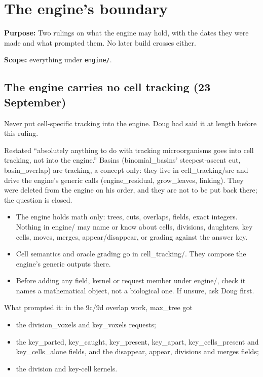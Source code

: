 \chapter{\texorpdfstring{The engine's boundary}{The engine's boundary}}
\label{chap:engine-boundary}

\textbf{Purpose:} Two rulings on what the engine may hold, with the dates they were made and what prompted them. No later build crosses either.

\textbf{Scope:} everything under \texttt{engine/\allowbreak{}}.

\section{\texorpdfstring{The engine carries no cell tracking (23 September)}{The engine carries no cell tracking (23 September)}}

Never put cell-specific tracking into the engine. Doug had said it at length before this ruling.

Restated “absolutely anything to do with tracking microorganisms goes into cell tracking, not into the engine.” Basins (binomial\_\allowbreak{}basins' steepest-ascent cut, basin\_\allowbreak{}overlap) are tracking, a concept only: they live in cell\_\allowbreak{}tracking/src and drive the engine's generic calls (engine\_\allowbreak{}residual, grow\_\allowbreak{}leaves, linking). They were deleted from the engine on his order, and they are not to be put back there; the question is closed.

\begin{itemize}
\item The engine holds math only: trees, cuts, overlaps, fields, exact integers. Nothing in engine/ may name or know about cells, divisions, daughters, key cells, moves, merges, appear/disappear, or grading against the answer key.
\item Cell semantics and oracle grading go in cell\_\allowbreak{}tracking/. They compose the engine's generic outputs there.
\item Before adding any field, kernel or request member under engine/, check it names a mathematical object, not a biological one. If unsure, ask Doug first.
\end{itemize}

What prompted it: in the 9c/9d overlap work, max\_\allowbreak{}tree got

\begin{itemize}
\item the division\_\allowbreak{}voxels and key\_\allowbreak{}voxels requests;
\item the key\_\allowbreak{}parted, key\_\allowbreak{}caught, key\_\allowbreak{}present, key\_\allowbreak{}apart, key\_\allowbreak{}cells\_\allowbreak{}present and key\_\allowbreak{}cells\_\allowbreak{}alone fields, and the disappear, appear, divisions and merges fields;
\item the division and key-cell kernels.
\end{itemize}


